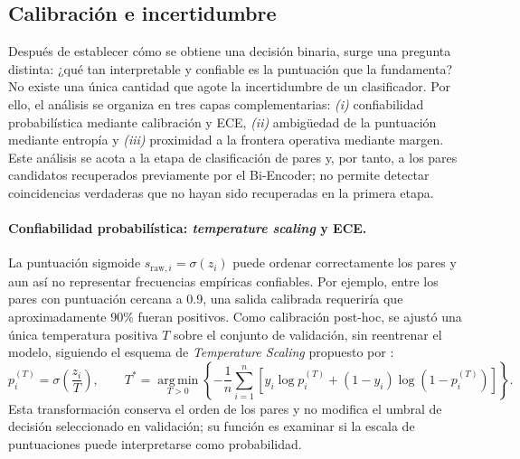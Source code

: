 \subsection{Calibración e incertidumbre}\label{sec:calibracion_incertidumbre}

Después de establecer cómo se obtiene una decisión binaria, surge una pregunta distinta: ¿qué tan interpretable y confiable es la puntuación que la fundamenta? No existe una única cantidad que agote la incertidumbre de un clasificador. Por ello, el análisis se organiza en tres capas complementarias: \textit{(i)} confiabilidad probabilística mediante calibración y ECE, \textit{(ii)} ambigüedad de la puntuación mediante entropía y \textit{(iii)} proximidad a la frontera operativa mediante margen. Este análisis se acota a la etapa de clasificación de pares y, por tanto, a los pares candidatos recuperados previamente por el Bi-Encoder; no permite detectar coincidencias verdaderas que no hayan sido recuperadas en la primera etapa.

\paragraph{Confiabilidad probabilística: \textit{temperature scaling} y ECE.}
La puntuación sigmoide $s_{\mathrm{raw},i}=\sigma(z_i)$ puede ordenar correctamente los pares y aun así no representar frecuencias empíricas confiables. Por ejemplo, entre los pares con puntuación cercana a 0.9, una salida calibrada requeriría que aproximadamente 90\% fueran positivos. Como calibración post-hoc, se ajustó una única temperatura positiva $T$ sobre el conjunto de validación, sin reentrenar el modelo, siguiendo el esquema de \textit{Temperature Scaling} propuesto por \textcite{guo2017}:
\begin{equation}
    p_i^{(T)} = \sigma\left(\frac{z_i}{T}\right),
    \qquad
    T^* = \underset{T>0}{\operatorname{arg\,min}}\left\{-\frac{1}{n}\sum_{i=1}^{n}\left[y_i\log p_i^{(T)}+(1-y_i)\log\left(1-p_i^{(T)}\right)\right]\right\}.
    \label{eq:temperature_scaling}
\end{equation}
Esta transformación conserva el orden de los pares y no modifica el umbral de decisión seleccionado en validación; su función es examinar si la escala de puntuaciones puede interpretarse como probabilidad.

